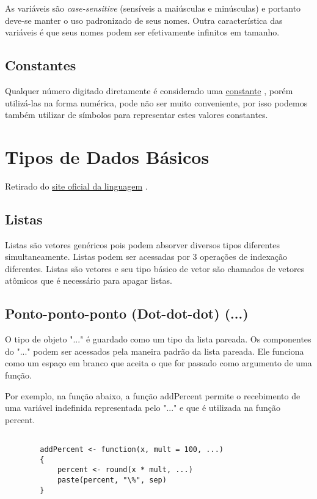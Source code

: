       As variáveis são \textit{case-sensitive} (sensíveis a maiúsculas e minúsculas) e portanto deve-se manter o uso padronizado de seus nomes. Outra característica das variáveis é que seus nomes podem ser efetivamente infinitos em tamanho.

    \subsection{Constantes}
     Qualquer número digitado diretamente é considerado uma \href{https://cran.r-project.org/doc/manuals/r-release/R-lang.html#Constants}{constante} \cite{Team2021b}, porém utilizá-las na forma numérica, pode não ser muito conveniente, por isso podemos também utilizar de símbolos para representar estes valores constantes.
  \section{Tipos de Dados Básicos} 
  	Retirado do
  	\href{https://cran.r-project.org/doc/manuals/r-release/R-lang.html#Basic-types}{site oficial da linguagem} \cite{Team2021b}.
    \subsection{Listas}
      Listas são vetores genéricos pois podem absorver diversos tipos diferentes simultaneamente. Listas podem ser acessadas por 3 operações de indexação diferentes. Listas são vetores e seu tipo básico de vetor são chamados de vetores atômicos que é necessário para apagar listas.
    \subsection{Ponto-ponto-ponto (Dot-dot-dot) (...)}
      O tipo de objeto "..." é guardado como um tipo da lista pareada. Os componentes do "..." podem ser acessados pela maneira padrão da lista pareada. Ele funciona como um espaço em branco que aceita o que for passado como argumento de uma função.
        
      Por exemplo, na função abaixo, a função addPercent permite o recebimento de uma variável indefinida representada pelo "..." e que é utilizada na função percent.
      \color{blue}
      \begin{verbatim}
      	
      	addPercent <- function(x, mult = 100, ...)
      	{
      		percent <- round(x * mult, ...)
      		paste(percent, "\%", sep)
      	}
      \end{verbatim}
      \color{black}
